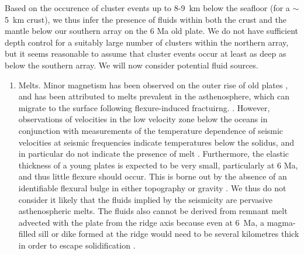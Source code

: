 \documentclass[reviewcopy]{elsarticle}
\begin{document}
Based on the occurence of cluster events up to 8-9~km below the
seafloor (for a $\sim$5~km crust), we thus infer
the presence of fluids within both the crust and the  mantle below our southern
array on the 6 Ma old plate.
We do not have sufficient
depth control for a suitably large number of clusters within the
northern array, but it seems reasonable to assume that cluster events
occur at least as deep as below the southern array. We will now
consider potential fluid sources.
\begin{enumerate}
\item Melts. Minor magnetism has been observed on the outer rise of
  old plates \citep{hirano04}, and has been attributed to
  melts prevalent in the asthenosphere, which can migrate to the
  surface following flexure-induced fractuirng.
  \citep{hirano06}.   However, observations of velocities in
  the low velocity zone below the oceans  in conjunction with
  measurements of the temperature dependence of seismic velocities at
  seismic frequencies indicate temperatures below the solidus, and in
  particular do not indicate the presence of melt \citep{priestley05,faul05}.
   Furthermore, the elastic thickness of a young plates
   is expected to be very small, particularly at 6 Ma, and thus little flexure should
  occur.   This   is borne out by the absence of an identifiable flexural bulge in either topography or
  gravity \citep[e.g.]{bry03}.   We thus do not consider it likely that
  the fluids implied by the seismicity are pervasive asthenospheric
  melts.  The fluids also cannot be derived from remnant melt advected
  with the plate from the ridge axis because
  even at 6~Ma, a magma-filled sill or dike formed
  at the ridge would need to be several kilometres thick in order to
  escape solidification \citep{turcotte02}.
%


\end{enumerate}
\end{document}
